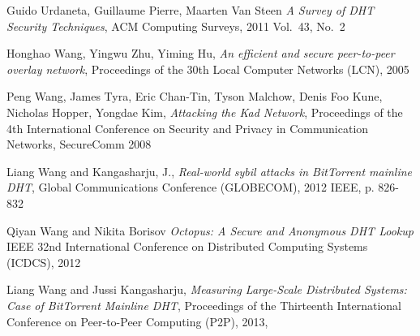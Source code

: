 \begin{thebibliography}{99}
 Guido Urdaneta, Guillaume Pierre, Maarten Van Steen
\textit{A Survey of DHT Security Techniques},
  ACM Computing Surveys,
  2011
  Vol.~43,
  No.~2

  Honghao Wang, Yingwu Zhu, Yiming Hu,
  \textit{An efficient and secure peer-to-peer overlay network}, 
  Proceedings of the 30th Local Computer Networks (LCN),
  2005

  Peng Wang, James Tyra, Eric Chan-Tin, Tyson Malchow, Denis Foo Kune, Nicholas
  Hopper, Yongdae Kim,
  \textit{Attacking the Kad Network},
  Proceedings of the 4th International Conference on Security and Privacy in
  Communication Networks,
  SecureComm 2008

  Liang Wang and Kangasharju, J.,
  \textit{Real-world sybil attacks in BitTorrent mainline DHT},
  Global Communications Conference (GLOBECOM), 2012 IEEE, p. 826-832

   Qiyan Wang and Nikita Borisov
   \textit{Octopus: A Secure and Anonymous DHT Lookup}
   IEEE 32nd International Conference on Distributed Computing Systems (ICDCS), 2012

  Liang Wang and Jussi Kangasharju,
  \textit{Measuring Large-Scale Distributed Systems: Case of BitTorrent
  Mainline DHT}, 
  Proceedings of the Thirteenth International Conference on Peer-to-Peer
  Computing (P2P),
  2013,


\end{thebibliography}


